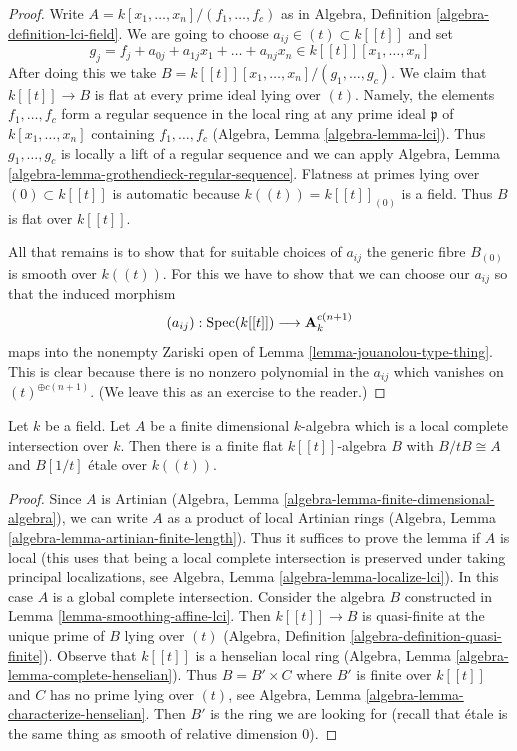\begin{proof}
Write $A = k[x_1, \ldots, x_n]/(f_1, \ldots, f_c)$ as in
Algebra, Definition \ref{algebra-definition-lci-field}.
We are going to choose
$a_{ij} \in (t) \subset k[[t]]$ and set
$$
g_j = f_j + a_{0j} + a_{1j}x_1 + \ldots + a_{nj}x_n \in
k[[t]][x_1, \ldots, x_n]
$$
After doing this we take
$B = k[[t]][x_1, \ldots, x_n]/(g_1, \ldots, g_c)$.
We claim that $k[[t]] \to B$ is flat at every prime ideal
lying over $(t)$. Namely, the elements $f_1, \ldots, f_c$
form a regular sequence in the local ring at any prime ideal
$\mathfrak p$ of $k[x_1, \ldots, x_n]$ containing $f_1, \ldots, f_c$
(Algebra, Lemma \ref{algebra-lemma-lci}). Thus $g_1, \ldots, g_c$
is locally a lift of a regular sequence and we can apply
Algebra, Lemma \ref{algebra-lemma-grothendieck-regular-sequence}.
Flatness at primes lying over $(0) \subset k[[t]]$ is automatic
because $k((t)) = k[[t]]_{(0)}$ is a field. Thus $B$ is flat
over $k[[t]]$.

\medskip\noindent
All that remains is to show that for suitable choices
of $a_{ij}$ the generic fibre $B_{(0)}$ is smooth over
$k((t))$. For this we have to show that we can choose
our $a_{ij}$ so that the induced morphism
$$
(a_{ij}) : \mathop{\mathrm{Spec}}(k[[t]]) \longrightarrow \mathbf{A}^{c(n + 1)}_k
$$
maps into the nonempty Zariski open of
Lemma \ref{lemma-jouanolou-type-thing}.
This is clear because there is no nonzero polynomial in the
$a_{ij}$ which vanishes on $(t)^{\oplus c(n + 1)}$.
(We leave this as an exercise to the reader.)
\end{proof}

\begin{lemma}
\label{lemma-smoothing-artinian-lci}
Let $k$ be a field. Let $A$ be a finite dimensional $k$-algebra
which is a local complete intersection over $k$. Then there is
a finite flat $k[[t]]$-algebra $B$ with $B/tB \cong A$
and $B[1/t]$ \'etale over $k((t))$.
\end{lemma}

\begin{proof}
Since $A$ is Artinian
(Algebra, Lemma \ref{algebra-lemma-finite-dimensional-algebra}),
we can write $A$ as a product of local Artinian rings
(Algebra, Lemma \ref{algebra-lemma-artinian-finite-length}).
Thus it suffices to prove the lemma if $A$ is local
(this uses that being a local complete intersection is
preserved under taking principal localizations, see
Algebra, Lemma \ref{algebra-lemma-localize-lci}).
In this case $A$ is a global complete intersection.
Consider the algebra $B$ constructed in
Lemma \ref{lemma-smoothing-affine-lci}.
Then $k[[t]] \to B$ is quasi-finite at the unique prime of $B$
lying over $(t)$ (Algebra, Definition \ref{algebra-definition-quasi-finite}).
Observe that $k[[t]]$ is a henselian local ring
(Algebra, Lemma \ref{algebra-lemma-complete-henselian}).
Thus $B = B' \times C$ where $B'$ is finite over $k[[t]]$
and $C$ has no prime lying over $(t)$, see
Algebra, Lemma \ref{algebra-lemma-characterize-henselian}.
Then $B'$ is the ring we are looking for
(recall that \'etale is the same thing as
smooth of relative dimension $0$).
\end{proof}

